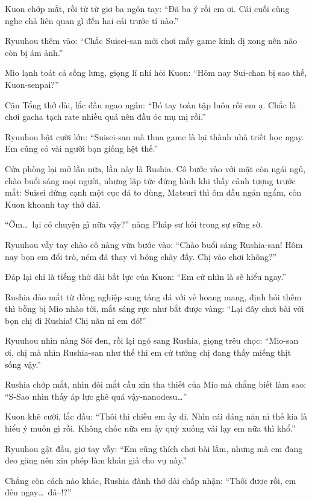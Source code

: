 \documentclass[../main.tex]{subfiles}
\begin{document}
Kuon chớp mắt, rồi từ từ giơ ba ngón tay: ``Đã ba ý rồi em ơi. Cái cuối cùng nghe chả liên quan gì đến hai cái trước tí nào.''

Ryuuhou thêm vào: ``Chắc Suisei-san mới chơi mấy game kinh dị xong nên não còn bị ám ảnh.''

Mio lạnh toát cả sống lưng, giọng lí nhí hỏi Kuon: ``Hôm nay Sui-chan bị sao thế, Kuon-senpai?''

Cậu Tổng thở dài, lắc đầu ngao ngán: ``Bó tay toàn tập luôn rồi em ạ. Chắc là chơi gacha tạch rate nhiều quá nên đầu óc mụ mị rồi.''

Ryuuhou bật cười lớn: ``Suisei-san mà thua game là lại thành nhà triết học ngay. Em cũng có vài người bạn giống hệt thế.''

Cửa phòng lại mở lần nữa, lần này là Rushia. Cô bước vào với mặt còn ngái ngủ, chào buổi sáng mọi người, nhưng lập tức đứng hình khi thấy cảnh tượng trước mắt: Suisei đứng cạnh một cục đá to đùng, Matsuri thì ôm đầu ngán ngẩm, còn Kuon khoanh tay thở dài.

``Ờm\dots\ lại có chuyện gì nữa vậy?'' nàng Pháp sư hỏi trong sự sững sờ.

Ryuuhou vẫy tay chào cô nàng vừa bước vào: ``Chào buổi sáng Rushia-san! Hôm nay bọn em đổi trò, ném đá thay vì bóng chày đấy. Chị vào chơi không?''

Đáp lại chỉ là tiếng thở dài bất lực của Kuon: ``Em cứ nhìn là sẽ hiểu ngay.''

Rushia đảo mắt từ đồng nghiệp sang tảng đá với vẻ hoang mang, định hỏi thêm thì bỗng bị Mio nhào tới, mắt sáng rực như bắt được vàng: ``Lại đây chơi bài với bọn chị đi Rushia! Chị năn nỉ em đó!''

Ryuuhou nhìn nàng Sói đen, rồi lại ngó sang Rushia, giọng trêu chọc: ``Mio-san ơi, chị mà nhìn Rushia-san như thế thì em cứ tưởng chị đang thấy miếng thịt sống vậy.''

Rushia chớp mắt, nhìn đôi mắt cầu xin tha thiết của Mio mà chẳng biết làm sao: ``S-Sao nhìn thấy áp lực ghê quá vậy-nanodesu\dots''


Kuon khẽ cười, lắc đầu: ``Thôi thì chiều em ấy đi. Nhìn cái dáng năn nỉ thế kia là hiểu ý muốn gì rồi. Không chốc nữa em ấy quỳ xuống vái lạy em nữa thì khổ.''

Ryuuhou gật đầu, giơ tay vẫy: ``Em cũng thích chơi bài lắm, nhưng mà em đang đeo găng nên xin phép làm khán giả cho vụ này.''

Chẳng còn cách nào khác, Rushia đành thở dài chấp nhận: ``Thôi được rồi, em đến ngay\dots\ đâ--!?''
\end{document}
